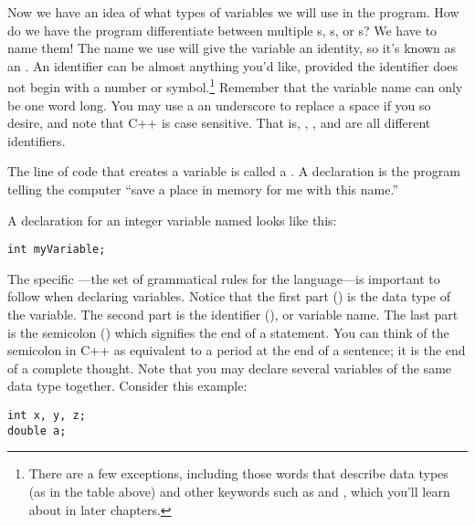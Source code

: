 Now we have an idea of what types of variables we will use in the program. 
How do we have the program differentiate between multiple s, s, or s? 
We have to name them! 
The name we use will give the variable an identity, so it's known as an . 
An identifier can be almost anything you'd like, provided the identifier does not begin with a number or symbol.\footnote{There are a few exceptions, including those words that describe data types (as in the table above) and other keywords such as  and , which you'll learn about in later chapters.} 
Remember that the variable name can only be one word long. 
You may use a an underscore to replace a space if you so desire, and note that C++ is case sensitive. 
That is, , , and  are all different identifiers.


The line of code that creates a variable is called a . 
A declaration is the program telling the computer ``save a place in memory for me with this name.'' 

A declaration for an integer variable named  looks like this:

\noindent\begin{minipage}{\linewidth}\begin{lstlisting}
int myVariable;
\end{lstlisting}\end{minipage}

The specific ---the set of grammatical rules for the language---is important to follow when declaring variables.
Notice that the first part () is the data type of the variable.
The second part is the identifier (), or variable name. 
The last part is the semicolon (\Code{;}) which signifies the end of a statement. 
You can think of the semicolon in C++ as equivalent to a period at the end of a sentence; it is the end of a complete thought. 
Note that you may declare several variables of the same data type together.  Consider this example: \nopagebreak[4]

\noindent\begin{minipage}{\linewidth}\begin{lstlisting}
int x, y, z;
double a;
\end{lstlisting}\end{minipage}

